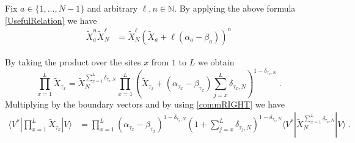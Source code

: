 \documentclass[10pt]{article}
\numberwithin{equation}{section}
\numberwithin{equation}{subsection}
\newcommand{\dt}{\;.}
\begin{document}
Fix $ a\in \{1,\ldots,N-1\}$ and arbitrary $ \ell,n\in \mathbb{N}$. By applying the above formula \eqref{UsefulRelation} we have
\begin{align}\label{usefulRelaton-many}
	\widetilde{X}_{a}^{n}\widetilde{X}_{N}^{\ell}&=%
	\widetilde{X}_{N}^{\ell}\left(\widetilde{X}_{a}+\ell(\alpha_{a}-\beta_{a})\right)^{n}
\end{align}
\begin{comment}
therefore 
\begin{align*}
	\widetilde{X}_{1}^{n_{1}}\ldots\widetilde{X}_{N-1}^{n_{N-1}}\widetilde{X}_{N}^{n_{N}}=\widetilde{X}_{N}^{n_{N}}\prod_{a=1}^{N-1}\left(\widetilde{X}_{a}+n_{N}(\alpha_{a}-\beta_{a})\right)^{n_{a}}\dt
\end{align*}
\end{comment}
By taking the product over the sites $x$ from $1$ to $L$ we obtain 
\begin{equation}
	\prod_{x=1}^{L}\widetilde{X}_{\tau_{x}}=\widetilde{X}_{N}^{\sum_{x=1}^{L}\delta_{\tau_{x},N}}\prod_{x=1}^{L}\left(\widetilde{X}_{\tau_{x}}+(\alpha_{\tau_{x}}-\beta_{\tau_{x}})\sum_{j=x}^{L}\delta_{\tau_{x},N}\right)^{1-\delta_{\tau_{x},N}}\dt
\end{equation}
Multiplying by the boundary vectors and by using \eqref{commRIGHT} we have 
\begin{align}
	\langle V^{*}|\prod_{x=1}^{L}\widetilde{X}_{\tau_{x}}
	|V \rangle\nonumber&=
	\prod_{x=1}^{L}\left(\alpha_{\tau_{x}}-\beta_{\tau_{x}}\right)^{1-\delta_{\tau_{x},N}}\left(1+\sum_{j=x}^{L}\delta_{\tau_{j},N}\right)^{1-\delta_{\tau_{x},N}}\langle V^{*}|\widetilde{X}_{N}^{\sum_{x=1}^{L}\delta_{\tau_{x},N}}|V\rangle \dt
\end{align}
\end{document}
